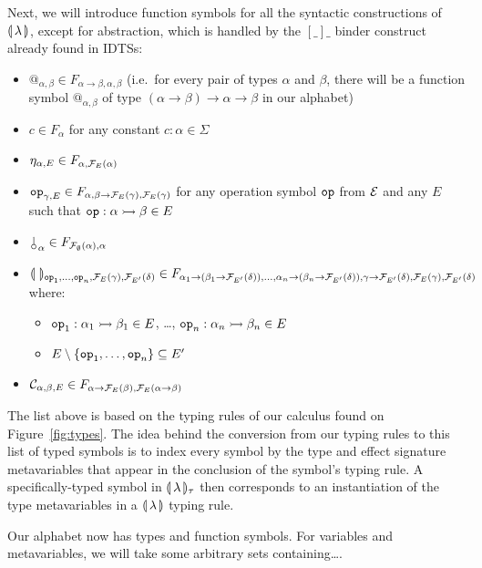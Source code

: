Next, we will introduce function symbols for all the syntactic
constructions of $\llparenthesis \, \lambda \, \rrparenthesis$, except for abstraction, which is
handled by the $[\_]\_$ binder construct already found in IDTSs:

\begin{itemize}
\item $@_{\alpha, \beta} \in F_{\alpha \to \beta, \alpha, \beta}$
  (i.e.\ for every pair of types $\alpha$ and $\beta$, there will be a
  function symbol $@_{\alpha,\beta}$ of type $(\alpha \to \beta) \to
  \alpha \to \beta$ in our alphabet)
\item $c \in F_{\alpha}$ for any constant $c : \alpha \in \Sigma$
\item $\eta_{\alpha, E} \in F_{\alpha, \mathcal{F}_E(\alpha)}$
\item $\mathtt{op}_{\gamma, E} \in F_{\alpha, \beta \to \mathcal{F}_E(\gamma),
  \mathcal{F}_E(\gamma)}$ for any operation symbol $\mathtt{op}$ from $\mathcal{E}$ and any $E$
  such that $\mathtt{op} : \alpha \rightarrowtail \beta \in E$
\item $\cherry_\alpha \in F_{\FF_\emptyset(\alpha), \alpha}$
\item $\llparenthesis \,  \, \rrparenthesis_{\mathtt{op}_1, \ldots, \mathtt{op}_n, \mathcal{F}_E(\gamma),
  \mathcal{F}_{E'}(\delta)} \in F_{\alpha_1 \to (\beta_1 \to \mathcal{F}_{E'}(\delta)), \ldots,
  \alpha_n \to (\beta_n \to \mathcal{F}_{E'}(\delta)), \gamma \to \mathcal{F}_{E'}(\delta),
  \mathcal{F}_E(\gamma), \mathcal{F}_{E'}(\delta)}$ where:
  \begin{itemize}
  \item $\mathtt{op}_1 : \alpha_1 \rightarrowtail \beta_1 \in E$, \ldots,
    $\mathtt{op}_n : \alpha_n \rightarrowtail \beta_n \in E$
  \item $E \setminus \{\mathtt{op}_1, \ldots, \mathtt{op}_n\} \subseteq E'$
  \end{itemize}
\item $\mathcal{C}_{\alpha,\beta,E} \in F_{\alpha \to \mathcal{F}_E(\beta),\mathcal{F}_E(\alpha \to
  \beta)}$
\end{itemize}

The list above is based on the typing rules of our calculus found on
Figure~\ref{fig:types}. The idea behind the conversion from our typing
rules to this list of typed symbols is to index every symbol by the type
and effect signature metavariables that appear in the conclusion of the
symbol's typing rule. A specifically-typed symbol in
$\llparenthesis \, \lambda \, \rrparenthesis_\tau$ then corresponds to an instantiation of the type
metavariables in a $\llparenthesis \, \lambda \, \rrparenthesis$ typing rule.

Our alphabet now has types and function symbols. For variables and
metavariables, we will take some arbitrary sets containing\ldots {}.

